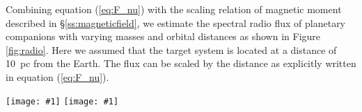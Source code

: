 \documentclass{emulateapj}
\def\plotonesc#1{\centering \leavevmode
\texttt{[image: \#1]}}
\begin{document}
Combining equation (\ref{eq:F_nu}) with the scaling relation of magnetic moment described in \S\ref{ss:magneticfield}, we estimate the spectral radio flux of planetary companions with varying masses and orbital distances as shown in Figure \ref{fig:radio}. Here we assumed that the target system is located at a distance of 10~pc from the Earth. The flux can be scaled by the distance as explicitly written in equation (\ref{eq:F_nu}). 


\begin{figure*}[bp]
   \plotonesc{radio_emission_Mdot1e-8_constRp.pdf}
   \plotonesc{radio_emission_Mdot1e-5_constRp.pdf}
   \caption{Top panel: Intensity of radio emission (in the unit of Jy) from a companion to a RG star (left) and an AGB star at 1 pc. The hashed region with vertical lines are not observable because of the plasma frequency cut-off of Earth's ionosphere. The hashed region with horizontal lines are not observable because of the plasma frequency cut-off of the stellar wind plasma in the vicinity of the companion. Bottom panel: cyclotron frequency, i.e., the frequency of radio emission. }
  \label{fig:radio}
\end{figure*}
\end{document}
